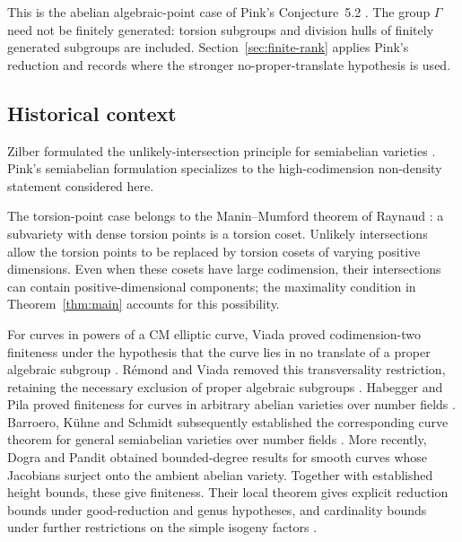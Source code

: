 This is the abelian algebraic-point case of Pink's
Conjecture~5.2 \cite{Pink2005}. The group $\Gamma$ need not be finitely
generated: torsion subgroups and division hulls of finitely generated
subgroups are included. Section~\ref{sec:finite-rank} applies Pink's
reduction \cite[Theorem~5.3]{Pink2005} and records where the stronger
no-proper-translate hypothesis is used.

\subsection{Historical context}
Zilber formulated the unlikely-intersection principle for semiabelian
varieties \cite{Zilber2002}. Pink's semiabelian formulation
\cite[Conjecture~5.1]{Pink2005} specializes to the high-codimension
non-density statement considered here.

The torsion-point case belongs to the Manin--Mumford theorem of Raynaud
\cite[p.~327, Th\'eor\`eme]{Raynaud1983Torsion}: a subvariety with dense
torsion points is a torsion coset. Unlikely intersections allow the torsion points to be
replaced by torsion cosets of varying positive dimensions. Even when
these cosets have large codimension, their intersections can contain
positive-dimensional components; the maximality condition in
Theorem~\ref{thm:main} accounts for this possibility.

For curves in powers of a CM elliptic curve, Viada proved
codimension-two finiteness under the hypothesis that the curve lies in
no translate of a proper algebraic subgroup
\cite[Theorem~2]{Viada2003}. R\'emond and Viada removed this
transversality restriction, retaining the necessary exclusion of proper
algebraic subgroups \cite[Theorem~1.7]{RemondViada2003}. Habegger and Pila proved
finiteness for curves in arbitrary abelian varieties over number fields
\cite[Theorem~1.1]{HabeggerPila2016}. Barroero, K\"uhne and Schmidt
subsequently established the corresponding curve theorem for general
semiabelian varieties over number fields
\cite[Theorem~1.1]{BarroeroKuhneSchmidt2023}.
More recently, Dogra and Pandit obtained bounded-degree results for smooth
curves whose Jacobians surject onto the ambient abelian variety. Together
with established height bounds, these give finiteness. Their local theorem
gives explicit reduction bounds under good-reduction and genus hypotheses,
and cardinality bounds under further restrictions on the simple isogeny factors
\cite[Theorem~1 and Corollary~1]{DograPandit2026}.

